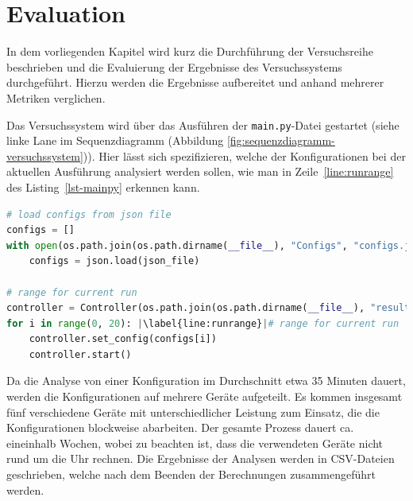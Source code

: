 \section{Evaluation} \label{sec:Evaluation}

\textauthor{\vJB,}{\vHS}{}{}

In dem vorliegenden Kapitel wird kurz die Durchführung der Versuchsreihe beschrieben und die Evaluierung der Ergebnisse des Versuchssystems durchgeführt.
Hierzu werden die Ergebnisse aufbereitet und anhand mehrerer Metriken verglichen.

Das Versuchssystem wird über das Ausführen der \texttt{main.py}-Datei gestartet (siehe linke Lane im Sequenzdiagramm (Abbildung \ref{fig:sequenzdiagramm-versuchssystem})).
Hier lässt sich spezifizieren, welche der Konfigurationen bei der aktuellen Ausführung analysiert werden sollen, wie man in Zeile~\ref{line:runrange} des Listing~\ref{lst-mainpy} erkennen kann.

\begin{lstlisting}[language=Python,caption=Ausführen einer Versuchsreihe,label=lst-mainpy,escapechar=|]
# load configs from json file
configs = []
with open(os.path.join(os.path.dirname(__file__), "Configs", "configs.json"), "r") as json_file:
    configs = json.load(json_file)

# range for current run
controller = Controller(os.path.join(os.path.dirname(__file__), "results.csv"))
for i in range(0, 20): |\label{line:runrange}|# range for current run
    controller.set_config(configs[i])
    controller.start()
\end{lstlisting}

Da die Analyse von einer Konfiguration im Durchschnitt etwa 35 Minuten dauert, werden die Konfigurationen auf mehrere Geräte aufgeteilt. 
Es kommen insgesamt fünf verschiedene Geräte mit unterschiedlicher Leistung zum Einsatz, die die Konfigurationen blockweise abarbeiten.
Der gesamte Prozess dauert ca. eineinhalb Wochen, wobei zu beachten ist, dass die verwendeten Geräte nicht rund um die Uhr rechnen.
Die Ergebnisse der Analysen werden in CSV-Dateien geschrieben, welche nach dem Beenden der Berechnungen zusammengeführt werden.

